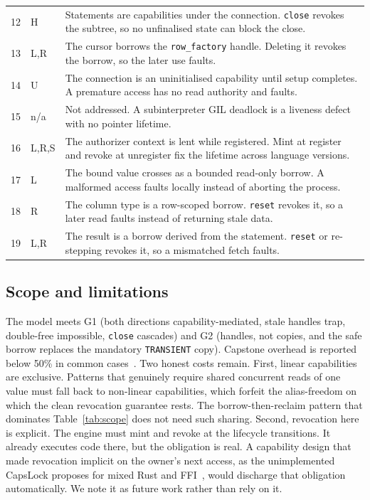 \documentclass[10pt,twocolumn]{article}
\begin{document}
\begin{table}[t]
\begin{tabular}{@{}r l p{14.2cm}@{}}
12 & H     & Statements are capabilities under the connection. \texttt{close} revokes the subtree, so no unfinalised state can block the close. \\
13 & L,R   & The cursor borrows the \texttt{row\_factory} handle. Deleting it revokes the borrow, so the later use faults. \\
14 & U     & The connection is an uninitialised capability until setup completes. A premature access has no read authority and faults. \\
15 & n/a   & Not addressed. A subinterpreter GIL deadlock is a liveness defect with no pointer lifetime. \\
16 & L,R,S & The authorizer context is lent while registered. Mint at register and revoke at unregister fix the lifetime across language versions. \\
17 & L     & The bound value crosses as a bounded read-only borrow. A malformed access faults locally instead of aborting the process. \\
18 & R     & The column type is a row-scoped borrow. \texttt{reset} revokes it, so a later read faults instead of returning stale data. \\
19 & L,R   & The result is a borrow derived from the statement. \texttt{reset} or re-stepping revokes it, so a mismatched fetch faults. \\
\bottomrule
\end{tabular}
\end{table}

\subsection{Scope and limitations}
The model meets G1 (both directions capability-mediated, stale handles trap,
double-free impossible, \texttt{close} cascades) and G2 (handles, not copies,
and the safe borrow replaces the mandatory \texttt{TRANSIENT} copy). Capstone
overhead is reported below 50\% in common cases~\cite{capstone}. Two honest
costs remain. First, linear capabilities are exclusive. Patterns that genuinely
require shared concurrent reads of one value must fall back to non-linear
capabilities, which forfeit the alias-freedom on which the clean revocation
guarantee rests. The borrow-then-reclaim pattern that dominates
Table~\ref{tab:scope} does not need such sharing. Second, revocation here is
explicit. The engine must mint and revoke at the lifecycle transitions. It
already executes code there, but the obligation is real. A capability design
that made revocation implicit on the owner's next access, as the unimplemented
CapsLock proposes for mixed Rust and FFI~\cite{capslock}, would discharge that
obligation automatically. We note it as future work rather than rely on it.
\end{document}
